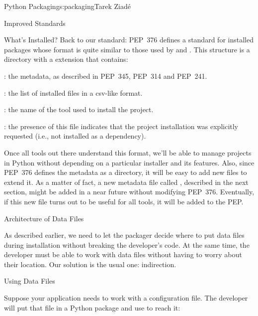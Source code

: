 \begin{aosachapter}{Python Packaging}{s:packaging}{Tarek Ziad\'{e}}
\begin{aosasect1}{Improved Standards}
\begin{aosasect2}{What's Installed?}
Back to our standard: PEP~376 defines a standard for installed
packages whose format is quite similar to those used by
 and .  This structure is a directory with
a  extension that contains:

\begin{aosaitemize}

  \item {}: the metadata, as described in PEP~345, PEP~314
  and PEP~241.

  \item {}: the list of installed files in a csv-like format.

  \item {}: the name of the tool used to install the
  project.

  \item {}: the presence of this file indicates that the
  project installation was explicitly requested (i.e., not installed
  as a dependency).

\end{aosaitemize}

\noindent
Once all tools out there understand this format, we'll be able to
manage projects in Python without depending on a particular installer
and its features.  Also, since PEP~376 defines the metadata as a
directory, it will be easy to add new files to extend it.  As a matter
of fact, a new metadata file called , described in the
next section, might be added in a near future without modifying
PEP~376. Eventually, if this new file turns out to be useful for all
tools, it will be added to the PEP.

\end{aosasect2}

\begin{aosasect2}{Architecture of Data Files}

As described earlier, we need to let the packager decide where to put
data files during installation without breaking the developer's
code. At the same time, the developer must be able to work with data
files without having to worry about their location.  Our solution is
the usual one: indirection.

\begin{aosasect3}{Using Data Files}

Suppose your  application needs to work with a
configuration file.  The developer will put that file in a Python
package and use  to reach it:


\end{aosasect3}
\end{aosasect2}
\end{aosasect1}
\end{aosachapter}

